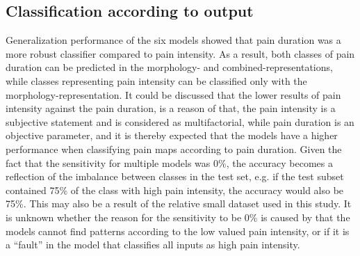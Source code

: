 \subsection*{Classification according to output}
Generalization performance of the six models showed that pain duration was a more robust classifier compared to pain intensity. As a result, both classes of pain duration can be predicted in the morphology- and combined-representations, while classes representing pain intensity can be classified only with the morphology-representation.
It could be discussed that the lower results of pain intensity against the pain duration, is a reason of that, the pain intensity is a subjective statement and is considered as multifactorial, while pain duration is an objective parameter, and it is thereby expected that the models have a higher performance when classifying pain maps according to pain duration. 
Given the fact that the sensitivity for multiple models was 0\%, the accuracy becomes a reflection of the imbalance between classes in the test set, e.g. if the test subset contained 75\% of the class with high pain intensity, the accuracy would also be 75\%. This may also be a result of the relative small dataset used in this study.  
It is unknown whether the reason for the sensitivity to be 0\% is caused by that the models cannot find patterns according to the low valued pain intensity, or if it is a “fault” in the model that classifies all inputs as high pain intensity.  


